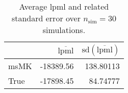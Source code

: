 \begin{table}[H]

\caption{Average lpml and related standard error over $n_{\text{sim}} = 30$ simulations.}
\centering
\begin{tabular}[t]{lrr}
\toprule
  & $\overbar{\text{lpml}}$ & $\text{sd}(\overbar{\text{lpml}})$\\
\midrule
msMK & -18389.56 & 138.80113\\
True & -17898.45 & 84.74777\\
\bottomrule
\end{tabular}
\end{table}